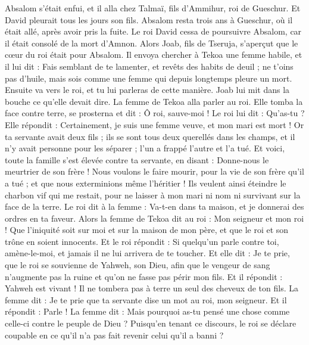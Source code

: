 \begin{multicols}{2}
Absalom s’était enfui, et il alla chez Talmaï, fils d’Ammihur, roi de Gueschur. Et David pleurait tous les jours son fils.
Absalom resta trois ans à Gueschur, où il était allé, après avoir pris la fuite.
Le roi David cessa de poursuivre Absalom, car il était consolé de la mort d'Amnon.
\VerseOne{}Alors Joab, fils de Tseruja, s’aperçut que le cœur du roi était pour Absalom.
Il envoya chercher à Tekoa une femme habile, et il lui dit : Fais semblant de te lamenter, et revêts des habits de deuil ; ne t'oins pas d'huile, mais sois comme une femme qui depuis longtemps pleure un mort.
Ensuite va vers le roi, et tu lui parleras de cette manière. Joab lui mit dans la bouche ce qu'elle devait dire.
La femme de Tekoa alla parler au roi. Elle tomba la face contre terre, se prosterna et dit : Ô roi, sauve-moi !
Le roi lui dit : Qu'as-tu ? Elle répondit : Certainement, je suis une femme veuve, et mon mari est mort !
Or ta servante avait deux fils ; ils se sont tous deux querellés dans les champs, et il n'y avait personne pour les séparer ; l'un a frappé l'autre et l'a tué.
Et voici, toute la famille s'est élevée contre ta servante, en disant : Donne-nous le meurtrier de son frère ! Nous voulons le faire mourir, pour la vie de son frère qu'il a tué ; et que nous exterminions même l'héritier ! Ils veulent ainsi éteindre le charbon vif qui me restait, pour ne laisser à mon mari ni nom ni survivant sur la face de la terre.
Le roi dit à la femme : Va-t-en dans ta maison, et je donnerai des ordres en ta faveur.
Alors la femme de Tekoa dit au roi : Mon seigneur et mon roi ! Que l'iniquité soit sur moi et sur la maison de mon père, et que le roi et son trône en soient innocents.
Et le roi répondit : Si quelqu’un parle contre toi, amène-le-moi, et jamais il ne lui arrivera de te toucher.
Et elle dit : Je te prie, que le roi se souvienne de Yahweh, son Dieu, afin que le vengeur de sang n’augmente pas la ruine et qu'on ne fasse pas périr mon fils. Et il répondit : Yahweh est vivant ! Il ne tombera pas à terre un seul des cheveux de ton fils.
La femme dit : Je te prie que ta servante dise un mot au roi, mon seigneur. Et il répondit : Parle !
La femme dit : Mais pourquoi as-tu pensé une chose comme celle-ci contre le peuple de Dieu ? Puisqu’en tenant ce discours, le roi se déclare coupable en ce qu’il n’a pas fait revenir celui qu’il a banni ?

\end{multicols}
